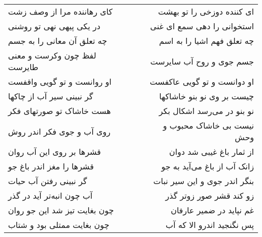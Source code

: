 \begin{center}
\begin{longtable}{l p{0.5cm} r}
کای رهاننده مرا از وصف زشت
&&
ای کننده دوزخی را تو بهشت
\\
در یکی پیهی نهی تو روشنی
&&
استخوانی را دهی سمع ای غنی
\\
چه تعلق آن معانی را به جسم
&&
چه تعلق فهم اشیا را به اسم
\\
لفظ چون وکرست و معنی طایرست
&&
جسم جوی و روح آب سایرست
\\
او روانست و تو گویی واقفست
&&
او دوانست و تو گویی عاکفست
\\
گر نبینی سیر آب از چاکها
&&
چیست بر وی نو بنو خاشاکها
\\
هست خاشاک تو صورتهای فکر
&&
نو بنو در می‌رسد اشکال بکر
\\
روی آب و جوی فکر اندر روش
&&
نیست بی خاشاک محبوب و وحش
\\
قشرها بر روی این آب روان
&&
از ثمار باغ غیبی شد دوان
\\
قشرها را مغز اندر باغ جو
&&
زانک آب از باغ می‌آید به جو
\\
گر نبینی رفتن آب حیات
&&
بنگر اندر جوی و این سیر نبات
\\
آب چون انبه‌تر آید در گذر
&&
زو کند قشر صور زوتر گذر
\\
چون بغایت تیز شد این جو روان
&&
غم نپاید در ضمیر عارفان
\\
چون بغایت ممتلی بود و شتاب
&&
پس نگنجید اندرو الا که آب
\\
\end{longtable}
\end{center}
